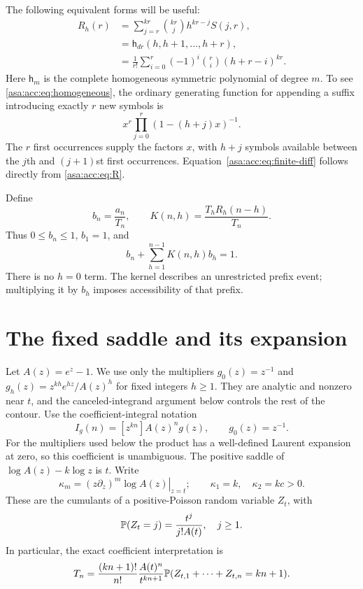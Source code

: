 \documentclass[11pt,letterpaper]{article}
\theoremstyle{remark}\newtheorem{remark}[theorem]{Remark}
\numberwithin{equation}{section}
\begin{document}
The following equivalent forms will be useful:
\begin{align}
R_h(r)&=\sum_{j=r}^{kr}\binom{kr}{j}h^{kr-j}S(j,r),\label{asa:acc:eq:suffix-sum}\\
&=\mathsf h_{dr}(h,h+1,\ldots,h+r),\label{asa:acc:eq:homogeneous}\\
&=\frac1{r!}\sum_{i=0}^{r}(-1)^i\binom ri(h+r-i)^{kr}.\label{asa:acc:eq:finite-diff}
\end{align}
Here $\mathsf h_m$ is the complete homogeneous symmetric polynomial of degree $m$. To see \eqref{asa:acc:eq:homogeneous}, the ordinary generating function for appending a suffix introducing exactly $r$ new symbols is
\[
x^r\prod_{j=0}^{r}(1-(h+j)x)^{-1}.
\]
The $r$ first occurrences supply the factors $x$, with $h+j$ symbols available between the $j$th and $(j+1)$st first occurrences. Equation~\eqref{asa:acc:eq:finite-diff} follows directly from \eqref{asa:acc:eq:R}.

Define
\begin{equation}\label{asa:acc:eq:kernel}
b_n=\frac{a_n}{T_n},\qquad K(n,h)=\frac{T_hR_h(n-h)}{T_n}.
\end{equation}
Thus $0\le b_n\le1$, $b_1=1$, and
\begin{equation}\label{asa:acc:eq:b-renewal}
b_n+\sum_{h=1}^{n-1}K(n,h)b_h=1.
\end{equation}
There is no $h=0$ term. The kernel describes an unrestricted prefix event; multiplying it by $b_h$ imposes accessibility of that prefix.

\section{The fixed saddle and its expansion}\label{asa:acc:sec:saddle}
Let $A(z)=e^z-1$. We use only the multipliers $g_0(z)=z^{-1}$ and $g_h(z)=z^{kh}e^{hz}/A(z)^h$ for fixed integers $h\ge1$. They are analytic and nonzero near $t$, and the canceled-integrand argument below controls the rest of the contour. Use the coefficient-integral notation
\[
I_g(n)=[z^{kn}]A(z)^n g(z),\qquad g_0(z)=z^{-1}.
\]
For the multipliers used below the product has a well-defined Laurent expansion at zero, so this coefficient is unambiguous. The positive saddle of $\log A(z)-k\log z$ is $t$. Write
\begin{equation}\label{asa:acc:eq:cumulants}
\kappa_m=\left.(z\partial_z)^m\log A(z)\right|_{z=t};\qquad
\kappa_1=k,\quad \kappa_2=kc>0.
\end{equation}
These are the cumulants of a positive-Poisson random variable $Z_t$, with
\[
\mathbb P(Z_t=j)=\frac{t^j}{j!A(t)},\quad j\ge1.
\]
In particular, the exact coefficient interpretation is
\[
T_n=\frac{(kn+1)!}{n!}\frac{A(t)^n}{t^{kn+1}}
\mathbb P(Z_{t,1}+\cdots+Z_{t,n}=kn+1).
\]
\end{document}

